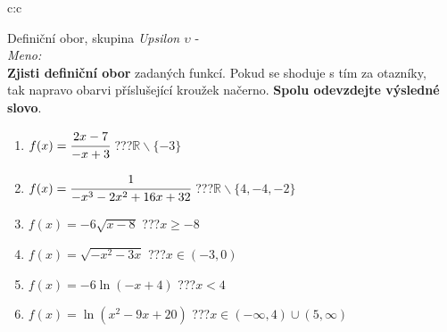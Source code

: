 \documentclass[10pt]{report}
\begin{document}
\newpage
\thispagestyle{empty}
\begin{tabular}{c:c}
\begin{minipage}[c][99mm][t]{0.49\linewidth}
\begin{center}
\vspace{7mm}
{\huge Definiční obor, skupina \textit{Upsilon $\upsilon$} -}\\[4.5mm]
\textit{Meno:}\phantom{xxxxxxxxxxxxxxxxxxxxxxxxxxxxxxxxxxxxxxxxxxxxxxxxxxxxxxxxxxxxxxxxx}\\[3.5mm]
\textbf{Zjisti definiční obor} zadaných funkcí. Pokud se shoduje s tím za otazníky,\\tak napravo obarvi příslušející kroužek načerno. \textbf{Spolu odevzdejte výsledné slovo}.\\[3mm]
\begin{minipage}{0.77\linewidth}
\begin{center}
\begin{varwidth}{\textwidth}
\begin{enumerate}
\normalsize
\item $f(x)=\cfrac{2x-7}{-x+3}$\quad \dotfill\; ???\;\dotfill \quad $\mathbb{R}\smallsetminus\{-3\}$
\item $f(x)=\cfrac{1}{-x^3-2x^2+16x+32}$\quad \dotfill\; ???\;\dotfill \quad $\mathbb{R}\smallsetminus\{4,-4,-2\}$
\item $f(x)=-6\sqrt{x-8}$\quad \dotfill\; ???\;\dotfill \quad $x\geq-8$
\item $f(x)=\sqrt{-x^2-3x}$\quad \dotfill\; ???\;\dotfill \quad $x\in(-3 , 0)$
\item $f(x)=-6\ln{(-x+4)}$\quad \dotfill\; ???\;\dotfill \quad $x<4$
\item $f(x)=\ln{(x^2-9x+20)}$\quad \dotfill\; ???\;\dotfill \quad $x\in(-\infty , 4)\cup(5 , \infty)$
\end{enumerate}
\end{varwidth}
\end{center}
\end{minipage}
\begin{minipage}{0.20\linewidth}

\end{minipage}
\end{center}
\end{minipage}
\end{tabular}
\end{document}
